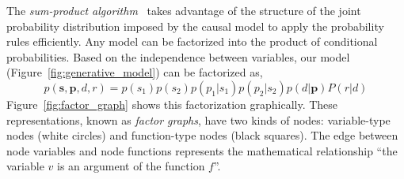 \documentclass[article]{jss}
\begin{document}
The \emph{sum-product algorithm}~\citep{Kschischang2001} takes advantage of the structure of the joint probability distribution imposed by the causal model to apply the probability rules efficiently. 
Any model can be factorized into the product of conditional probabilities. 
Based on the independence between variables, our model (Figure~\ref{fig:generative_model}) can be factorized as,
%
\begin{equation} \label{eq:factorization}
 p(\bm{s},\bm{p},d,r) = p(s_1)p(s_2)p(p_1|s_1)p(p_2|s_2)p(d|\bm{p})P(r|d)
\end{equation}
%
Figure~\ref{fig:factor_graph} shows this factorization graphically. 
These representations, known as \emph{factor graphs}, have two kinds of nodes: variable-type nodes (white circles) and function-type nodes (black squares). 
The edge between node variables and node functions represents the mathematical relationship ``the variable $v$ is an argument of the function $f$''. 
%
\end{document}
